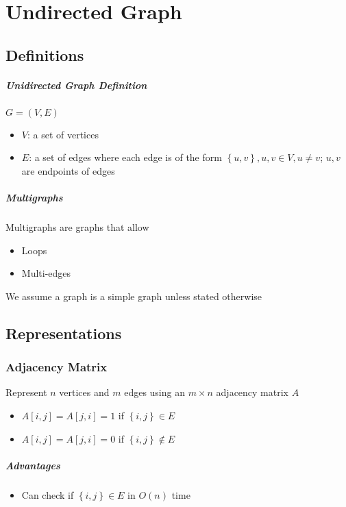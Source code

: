 \chapter{Undirected Graph}

\section{Definitions}
\paragraph{Unidirected Graph Definition} $ G = \left( V, E \right) $
\begin{itemize}
  \item $ V $: a set of vertices
  \item $ E $: a set of edges where each edge is of the form
  $ \left\{ u, v \right\}, u, v \in V, u \ne v $; $ u, v $ are endpoints of
  edges
\end{itemize}

\paragraph{Multigraphs} Multigraphs are graphs that allow
\begin{itemize}
  \item Loops
  \item Multi-edges
\end{itemize}
We assume a graph is a simple graph unless stated otherwise

\section{Representations}

  \subsection{Adjacency Matrix}

    Represent $ n $ vertices and $ m $ edges using an $ m \times n $
    adjacency matrix $ A $
    \begin{itemize}
      \item $ A\left[ i, j \right] = A\left[ j, i \right] = 1 $ if
      $ \left\{ i, j \right\} \in E $
      \item $ A\left[ i, j \right] = A\left[ j, i \right] = 0 $ if
      $ \left\{ i, j \right\} \notin E $
    \end{itemize}

    \paragraph{Advantages}
    \begin{itemize}
      \item Can check if $ \left\{ i, j \right\} \in E $ in
      $ O\left( n \right) $ time
    \end{itemize}

